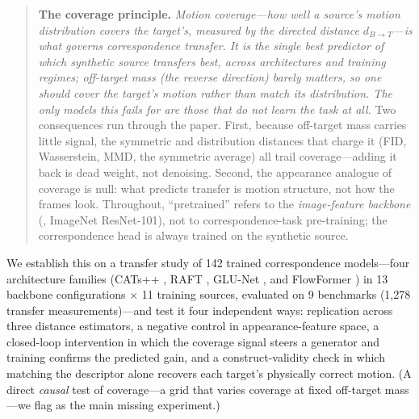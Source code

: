 \documentclass[runningheads]{llncs}
\newcommand{\dbt}{d_{B\to T}}
\begin{document}
\begin{quote}
\textbf{The coverage principle.} \emph{Motion coverage---how well a source's
motion distribution covers the target's, measured by the directed distance
$\dbt$---is what governs correspondence transfer. It is the single best
predictor of which synthetic source transfers best, across architectures and
training regimes; off-target mass (the reverse direction) barely matters, so one
should \emph{cover} the target's motion rather than \emph{match} its
distribution. The only models this fails for are those that do not learn the
task at all.}
Two consequences run through the paper. First, because off-target mass carries
little signal, the symmetric and distribution distances that charge it (FID,
Wasserstein, MMD, the symmetric average) all trail coverage---adding it back is
dead weight, not denoising. Second, the appearance analogue of coverage is null:
what predicts transfer is motion structure, not how the frames look. Throughout,
``pretrained'' refers to the \emph{image-feature backbone} (\eg, ImageNet
ResNet-101), not to correspondence-task pre-training; the correspondence head is
always trained on the synthetic source.
\end{quote}

We establish this on a transfer study of 142 trained correspondence
models---four architecture families (CATs++ \cite{cho2022cats++}, RAFT
\cite{teed2020raft}, GLU-Net \cite{truong2020glunet}, and FlowFormer
\cite{huang2022flowformer}) in 13 backbone configurations $\times$ 11 training
sources, evaluated on 9 benchmarks (1{,}278 transfer measurements)---and test it
four independent ways: replication across three distance estimators, a negative
control in appearance-feature space, a closed-loop intervention in which the
coverage signal steers a generator and training confirms the predicted gain,
and a construct-validity check in which matching the descriptor alone recovers
each target's physically correct motion. (A direct \emph{causal} test of
coverage---a grid that varies coverage at fixed off-target mass---we flag as the
main missing experiment.)
\end{document}
